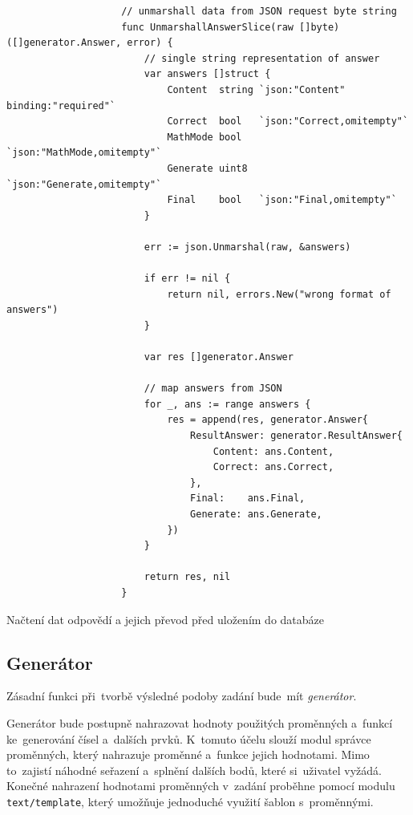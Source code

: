 \documentclass[11pt,a4paper]{report}
\begin{document}
            \begin{code}
                \begin{verbatim}
                    // unmarshall data from JSON request byte string
                    func UnmarshallAnswerSlice(raw []byte) ([]generator.Answer, error) {
                    	// single string representation of answer
                    	var answers []struct {
                    		Content  string `json:"Content" binding:"required"`
                    		Correct  bool   `json:"Correct,omitempty"`
                    		MathMode bool   `json:"MathMode,omitempty"`
                    		Generate uint8  `json:"Generate,omitempty"`
                    		Final    bool   `json:"Final,omitempty"`
                    	}
                    
                    	err := json.Unmarshal(raw, &answers)
                    
                    	if err != nil {
                    		return nil, errors.New("wrong format of answers")
                    	}
                    
                    	var res []generator.Answer
                    
                    	// map answers from JSON
                    	for _, ans := range answers {
                    		res = append(res, generator.Answer{
                    			ResultAnswer: generator.ResultAnswer{
                    				Content: ans.Content,
                    				Correct: ans.Correct,
                    			},
                    			Final:    ans.Final,
                    			Generate: ans.Generate,
                    		})
                    	}
                    
                    	return res, nil
                    }
                \end{verbatim}
                \caption{Načtení dat odpovědí a jejich převod před uložením do databáze}
                \label{go:unmarshallanswers}
            \end{code}

        \subsection{Generátor}
            Zásadní funkci při~tvorbě výsledné podoby zadání bude~mít \emph{generátor}.
            
            Generátor bude postupně nahrazovat hodnoty použitých proměnných a~funkcí ke~generování čísel a~dalších prvků. K~tomuto účelu slouží modul správce proměnných, který nahrazuje proměnné a~funkce jejich hodnotami. Mimo to~zajistí náhodné seřazení a~splnění dalších bodů, které si~uživatel vyžádá. Konečné nahrazení hodnotami proměnných v~zadání proběhne pomocí modulu \texttt{text/template}, který umožňuje jednoduché využití šablon s~proměnnými.
            
\end{document}
